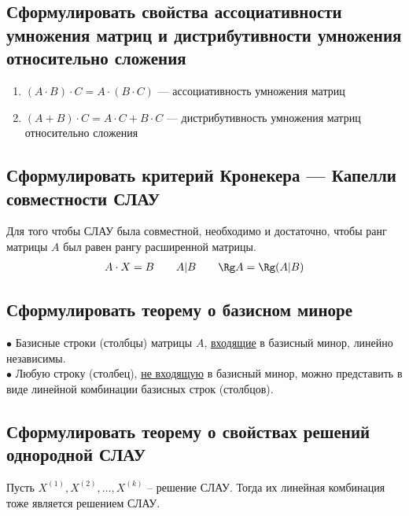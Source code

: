 \subsection{Сформулировать свойства ассоциативности умножения матриц и дистрибутивности умножения относительно сложения}
\begin{mdframed}[style=Teal, frametitle={Свойства:}]
	\begin{enumerate}
		\item $(A \cdot B) \cdot C = A\cdot (B\cdot C)$ --- ассоциативность умножения матриц
		\item $(A+B)\cdot C = A\cdot C + B\cdot C$ --- дистрибутивность умножения матриц относительно сложения
	\end{enumerate}
\end{mdframed}

\subsection{Сформулировать критерий Кронекера — Капелли совместности СЛАУ}
\begin{theorem*}
	Для того чтобы СЛАУ была совместной, необходимо и достаточно, чтобы ранг матрицы $A$ был равен рангу расширенной матрицы.
	\begin{gather*}
		A \cdot X = B \qquad A|B \qquad \Rg A = \Rg (A|B)
	\end{gather*}
\end{theorem*}

\newpage
\subsection{Сформулировать теорему о базисном миноре}
\begin{theorem*}
	$\bullet$ Базисные строки (столбцы) матрицы $A$, \underline{входящие} в базисный минор, линейно независимы.\\
	$\bullet$ Любую строку (столбец), \underline{не входящую} в базисный минор, можно представить в виде линейной комбинации базисных строк (столбцов).
\end{theorem*}

\subsection{Сформулировать теорему о свойствах решений однородной СЛАУ}
\begin{theorem*}
	Пусть $X^{(1)}, X^{(2)},\ldots, X^{(k)}$ -- решение СЛАУ. Тогда их линейная комбинация тоже является решением СЛАУ.
\end{theorem*} 

